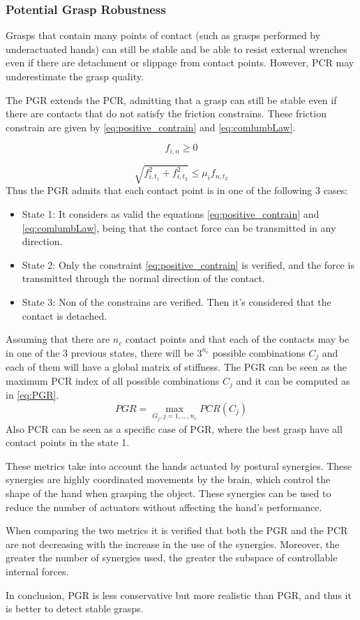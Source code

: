 \subsubsection{Potential Grasp Robustness}
Grasps that contain many points of contact (such as grasps performed by underactuated hands) can still be stable and be able to resist external wrenches even if there are detachment or slippage from contact points. However, PCR may underestimate the grasp quality.

The PGR extends the PCR, admitting that a grasp can still be stable even if there are contacts that do not satisfy the friction constrains. These friction constrain are given by \eqref{eq:positive_contrain} and \eqref{eq:comlumbLaw}.

\begin{equation}\label{eq:positive_contrain}
    f_{i,n} \ge 0
\end{equation}

\begin{equation}\label{eq:comlumbLaw}
    \sqrt{f_{i,t_1}^2+f_{i,t_2}^2} \le \mu_i  f_{n,t_2}
\end{equation}
Thus the PGR admits that each contact point is in one of the following 3 cases:
\begin{itemize}
    \item State 1: It considers as valid the equations \eqref{eq:positive_contrain} and \eqref{eq:comlumbLaw}, being that the contact force can be transmitted in any direction.
    \item State 2: Only the constraint \eqref{eq:positive_contrain} is verified, and the force is transmitted through the normal direction of the contact.
    \item State 3: Non of the constrains are verified. Then it's considered that the contact is detached.    
\end{itemize}
Assuming that there are $n_c$ contact points and that each of the contacts may be in one of the 3 previous states, there will be $3^{n_c}$ possible combinations $C_j$ and each of them will have a global matrix of stiffness.
The PGR can be seen as the maximum PCR index of all possible combinations $C_j$ and it can be computed as in \eqref{eq:PGR}.
\begin{equation}\label{eq:PGR}
    PGR = \max_{G_j, j=1,\dots, n_c}PCR(C_j)
\end{equation}
Also PCR can be seen as a specific case of PGR, where the best grasp have all contact points in the state 1.\par
These metrics take into account the hands actuated by postural synergies. These synergies are highly coordinated movements by the brain, which control the shape of the hand when grasping the object.
These synergies can be used to reduce the number of actuators without affecting the hand's performance. \par
When comparing the two metrics it is verified that both the PGR and the PCR are not decreasing with the increase in the use of the synergies. Moreover, the greater the number of synergies used, the greater the subspace of controllable internal forces. \par
In conclusion, PGR is less conservative but more realistic than PGR, and thus it is better to detect stable grasps.


